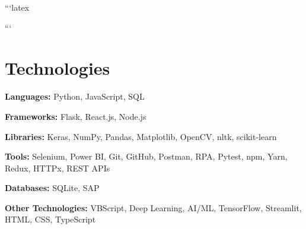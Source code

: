 ```latex

\newcommand{\AND}{\unskip
    \cleaders\copy\ANDbox\hskip\wd\ANDbox
    \ignorespaces
}
\newsavebox\ANDbox
\sbox\ANDbox{$|$}
\vspace{5 pt - 0.3 cm}
```

\section{Technologies}
\begin{onecolentry}
    \textbf{Languages:} Python, JavaScript, SQL
\end{onecolentry}
\vspace{0.05 cm}
\begin{onecolentry}
    \textbf{Frameworks:} Flask, React.js, Node.js
\end{onecolentry}
\vspace{0.05 cm}
\begin{onecolentry}
    \textbf{Libraries:} Keras, NumPy, Pandas, Matplotlib,
    OpenCV, nltk, scikit-learn
\end{onecolentry}
\vspace{0.05 cm}
\begin{onecolentry}
    \textbf{Tools:}  Selenium,  Power BI, Git, GitHub,
    Postman,  RPA, Pytest,  npm, Yarn, Redux,  HTTPx,
    REST APIs
\end{onecolentry}
\vspace{0.05 cm}
\begin{onecolentry}
    \textbf{Databases:} SQLite, SAP
\end{onecolentry}
\vspace{0.05 cm}
\begin{onecolentry}
    \textbf{Other Technologies:}  VBScript,  Deep Learning,
    AI/ML,  TensorFlow,  Streamlit,  HTML, CSS,  TypeScript
\end{onecolentry}


